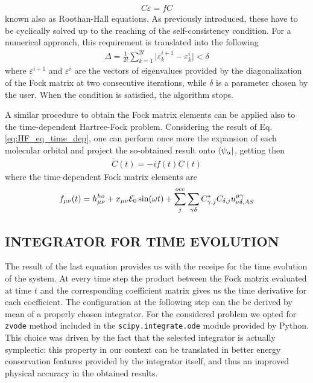 \begin{align*}
    C\varepsilon = fC
\end{align*}
known also as Roothan-Hall equations. As previously introduced, these have to be cyclically solved up to the reaching of the self-consistency condition. For a numerical approach, this requirement is translated into the following
\begin{align}
    \Delta = \frac{1}{2l} \sum_{k=1}^{2l} \vert \varepsilon_k^{i+1} - \varepsilon_k^i \vert  < \delta
    \label{eq:stop_condition}
\end{align}
where $\varepsilon^{i+1}$ and $\varepsilon^{i}$ are the vectors of eigenvalues provided by the diagonalization of the Fock matrix at two consecutive iterations, while $\delta$ is a parameter chosen by the user. When the condition is satisfied, the algorithm stops.

A similar procedure to obtain the Fock matrix elements can be applied also to the time-dependent Hartree-Fock problem. Considering the result of Eq.\,\ref{eq:HF_eq_time_dep}, one can perform once more the expansion of each molecular orbital and project the so-obtained result onto $\bra{\psi_\alpha}$, getting then
\begin{align*}
    \dot{C}(t) = -i f(t)C(t) 
\end{align*}
where the time-dependent Fock matrix elements are
\begin{align*}
    f_{\mu\nu}(t) =  h_{\mu\nu}^{ho} + x_{\mu\nu} \mathcal{E}_0 \sin(\omega t) + \sum_{j}^{occ} \sum_{\gamma\delta} C_{\gamma,j}^* C_{\delta,j} u^{\mu\gamma}_{\nu\delta,AS}
\end{align*}




\subsection{INTEGRATOR FOR TIME EVOLUTION}
\label{sec:integrator}
The result of the last equation provides us with the receipe for the time evolution of the system. At every time step the product between the Fock matrix evaluated at time $t$ and the corresponding coefficient matrix gives us the time derivative for each coefficient. The configuration at the following step can the be derived by mean of a properly chosen integrator. For the considered problem we opted for \texttt{zvode} method included in the \texttt{scipy.integrate.ode} \cite{scipy.int} module provided by Python. This choice was driven by the fact that the selected integrator is actually symplectic: this property in our context can be translated in better energy conservation features provided by the integrator itself, and thus an improved physical accuracy in the obtained results. 



